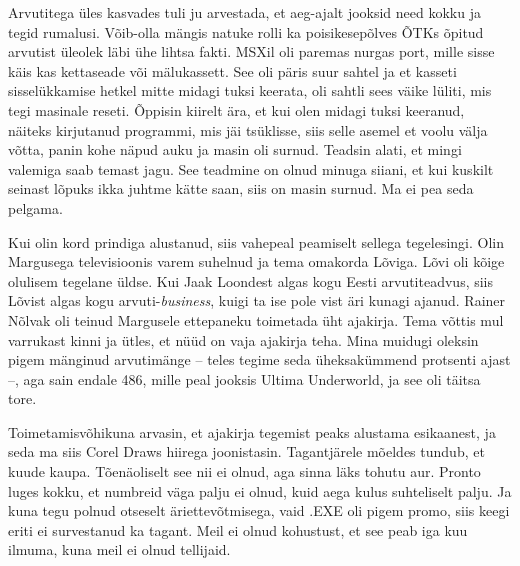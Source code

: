Arvutitega üles kasvades tuli ju arvestada, et aeg-ajalt 
jooksid need kokku ja tegid rumalusi. Võib-olla mängis natuke 
rolli ka poisikesepõlves ÕTKs õpitud arvutist üleolek läbi ühe lihtsa fakti. 
MSXil oli paremas nurgas port, mille sisse käis kas 
kettaseade või mälukassett. See oli päris suur 
sahtel ja et kasseti sisselükkamise hetkel mitte midagi tuksi 
keerata, oli sahtli sees väike lüliti, mis tegi masinale reseti. 
Õppisin kiirelt ära, et kui olen midagi tuksi keeranud, näiteks 
kirjutanud programmi, mis jäi tsüklisse, siis selle asemel et voolu välja 
võtta, panin kohe näpud auku ja masin oli surnud. Teadsin alati, et 
mingi valemiga saab temast jagu. See teadmine on olnud minuga siiani, et kui 
kuskilt seinast lõpuks ikka juhtme kätte saan, siis on masin surnud. Ma ei pea 
seda pelgama.


Kui olin kord prindiga alustanud, siis vahepeal peamiselt sellega tegelesingi. 
Olin 
Margusega televisioonis varem suhelnud ja tema omakorda 
Lõviga. Lõvi oli kõige olulisem 
tegelane üldse. Kui Jaak Loondest algas kogu Eesti 
arvutiteadvus, siis 
Lõvist algas kogu arvuti-\emph{business}, kuigi ta ise pole vist 
äri kunagi ajanud. 
Rainer Nõlvak oli teinud Margusele ettepaneku 
toimetada üht ajakirja. Tema võttis mul varrukast kinni ja ütles, 
et nüüd on vaja ajakirja teha. Mina muidugi oleksin pigem 
mänginud arvutimänge – teles tegime seda üheksakümmend 
protsenti ajast –, aga sain endale 486, mille peal jooksis Ultima 
Underworld, ja 
see oli täitsa tore. 

Toimetamisvõhikuna arvasin, et ajakirja tegemist peaks alustama 
esikaanest, ja seda ma siis Corel Draws hiirega 
joonistasin. Tagantjärele mõeldes tundub, et 
kuude kaupa. Tõenäoliselt see nii ei olnud, aga sinna läks tohutu aur. 
Pronto luges kokku, et numbreid väga palju ei olnud, kuid 
aega kulus 
suhteliselt palju. Ja kuna tegu polnud otseselt 
äriettevõtmisega, vaid .EXE oli pigem promo, siis keegi eriti ei 
survestanud ka tagant. Meil ei olnud kohustust, et see peab iga kuu ilmuma, 
kuna meil ei olnud 
tellijaid.

